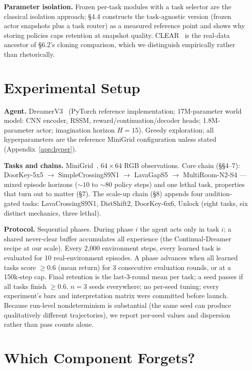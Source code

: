 \documentclass[10pt]{article}
\begin{document}
\textbf{Parameter isolation.} Frozen per-task modules with a task selector are the classical
isolation approach; \S4.4 constructs the task-agnostic version (frozen actor snapshots plus
a task router) as a measured reference point and shows why storing policies caps retention
at snapshot quality. CLEAR~\cite{rolnick2019experience} is the real-data ancestor of
\S6.2's cloning comparison, which we distinguish empirically rather than rhetorically.

\section{Experimental Setup}

\textbf{Agent.} DreamerV3~\cite{hafner2023mastering} (PyTorch reference implementation;
17M-parameter world model: CNN encoder, RSSM, reward/continuation/decoder heads;
1.8M-parameter actor; imagination horizon $H{=}15$). Greedy exploration; all hyperparameters
are the reference MiniGrid configuration unless stated (Appendix~\ref{app:hyper}).

\textbf{Tasks and chains.} MiniGrid~\cite{chevalier2023minigrid}, $64{\times}64$ RGB
observations. Core chain (\S\S4--7): DoorKey-5x5 $\rightarrow$ SimpleCrossingS9N1
$\rightarrow$ LavaGapS5 $\rightarrow$ MultiRoom-N2-S4 --- mixed episode horizons
(${\sim}10$ to ${\sim}80$ policy steps) and one lethal task, properties that turn out to
matter (\S7). The scale-up chain (\S8) appends four audition-gated tasks: LavaCrossingS9N1,
DistShift2, DoorKey-6x6, Unlock (eight tasks, six distinct mechanics, three lethal).

\textbf{Protocol.} Sequential phases. During phase $i$ the agent acts only in task $i$; a
shared never-clear buffer accumulates all experience (the Continual-Dreamer recipe at our
scale). Every 2{,}000 environment steps, every learned task is evaluated for 10
real-environment episodes. A phase advances when all learned tasks score ${\geq}0.6$ (mean
return) for 3 consecutive evaluation rounds, or at a 150k-step cap. Final retention is the
last-3-round mean per task; a seed passes if all tasks finish ${\geq}0.6$. $n{=}3$ seeds
everywhere; no per-seed tuning; every experiment's bars and interpretation matrix were
committed before launch. Because run-level nondeterminism is substantial (the same seed can
produce qualitatively different trajectories), we report per-seed values and dispersion
rather than pass counts alone.

\section{Which Component Forgets?}
\end{document}
